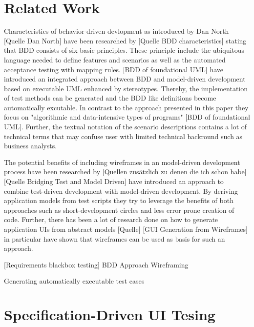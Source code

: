 \documentclass{sig-alternate-05-2015}
\begin{document}
\section{Related Work}\label{sec:RelatedWork}
Characteristics of behavior-driven devlopment as introduced by Dan North [Quelle Dan North] have been researched by [Quelle BDD characteristics] stating that BDD consists of six basic principles.
These principle include the ubiquitous language needed to define features and scenarios as well as the automated acceptance testing with mapping rules.
[BDD of foundational UML] have introduced an integrated approach between BDD and model-driven development based on executable UML enhanced by stereotypes.
Thereby, the implementation of test methods can be generated and the BDD like definitions become automatically excutable.
In contrast to the approach presented in this paper they focus on "algorithmic and data-intensive types of programs" [BDD of foundational UML].
Further, the textual notation of the scenario descriptions contains a lot of technical terms that may confuse user with limited technical backround such as business analysts.



The potential benefits of including wireframes in an model-driven development process have been researched by [Quellen zusätzlich zu denen die ich schon habe]
[Quelle Bridging Test and Model Driven] have introduced an approach to combine test-driven development with model-driven development.
By deriving application models from test scripts they try to leverage the benefits of both approaches such as short-development circles and less error prone creation of code.
Further, there has been a lot of research done on how to generate application UIs from abstract models [Quelle]
[GUI Generation from Wireframes] in particular have shown that wireframes can be used as basis for such an approach.



[Requirements blackbox testing] 
BDD Approach
Wireframing

Generating automatically executable test cases


\section{Specification-Driven UI Tesing}\label{sec:SpecificationDrivenUITesting}
\end{document}
